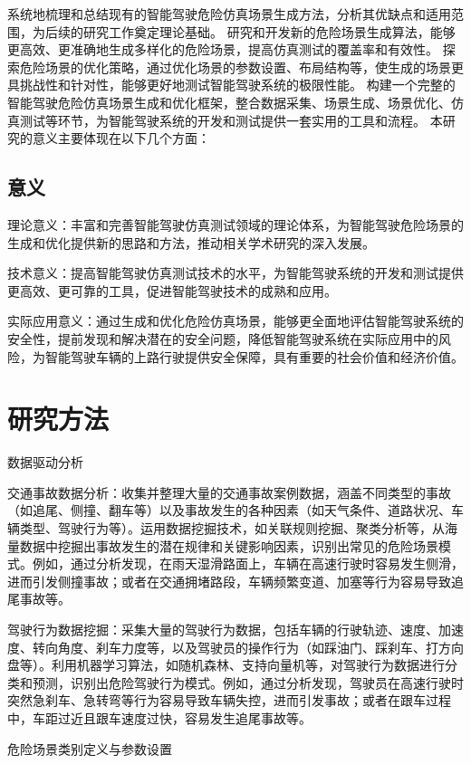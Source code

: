 系统地梳理和总结现有的智能驾驶危险仿真场景生成方法，分析其优缺点和适用范围，为后续的研究工作奠定理论基础。
研究和开发新的危险场景生成算法，能够更高效、更准确地生成多样化的危险场景，提高仿真测试的覆盖率和有效性。
探索危险场景的优化策略，通过优化场景的参数设置、布局结构等，使生成的场景更具挑战性和针对性，能够更好地测试智能驾驶系统的极限性能。
构建一个完整的智能驾驶危险仿真场景生成和优化框架，整合数据采集、场景生成、场景优化、仿真测试等环节，为智能驾驶系统的开发和测试提供一套实用的工具和流程。
本研究的意义主要体现在以下几个方面：

\subsection{意义}
理论意义：丰富和完善智能驾驶仿真测试领域的理论体系，为智能驾驶危险场景的生成和优化提供新的思路和方法，推动相关学术研究的深入发展。

技术意义：提高智能驾驶仿真测试技术的水平，为智能驾驶系统的开发和测试提供更高效、更可靠的工具，促进智能驾驶技术的成熟和应用。

实际应用意义：通过生成和优化危险仿真场景，能够更全面地评估智能驾驶系统的安全性，提前发现和解决潜在的安全问题，降低智能驾驶系统在实际应用中的风险，为智能驾驶车辆的上路行驶提供安全保障，具有重要的社会价值和经济价值。



\section{研究方法}

数据驱动分析

交通事故数据分析：收集并整理大量的交通事故案例数据，涵盖不同类型的事故（如追尾、侧撞、翻车等）以及事故发生的各种因素（如天气条件、道路状况、车辆类型、驾驶行为等）。运用数据挖掘技术，如关联规则挖掘、聚类分析等，从海量数据中挖掘出事故发生的潜在规律和关键影响因素，识别出常见的危险场景模式。例如，通过分析发现，在雨天湿滑路面上，车辆在高速行驶时容易发生侧滑，进而引发侧撞事故；或者在交通拥堵路段，车辆频繁变道、加塞等行为容易导致追尾事故等。

驾驶行为数据挖掘：采集大量的驾驶行为数据，包括车辆的行驶轨迹、速度、加速度、转向角度、刹车力度等，以及驾驶员的操作行为（如踩油门、踩刹车、打方向盘等）。利用机器学习算法，如随机森林、支持向量机等，对驾驶行为数据进行分类和预测，识别出危险驾驶行为模式。例如，通过分析发现，驾驶员在高速行驶时突然急刹车、急转弯等行为容易导致车辆失控，进而引发事故；或者在跟车过程中，车距过近且跟车速度过快，容易发生追尾事故等。

危险场景类别定义与参数设置

